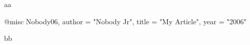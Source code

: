 aa

@misc{ Nobody06,
       author = "Nobody Jr",
       title = "My Article",
       year = "2006" }

bb

